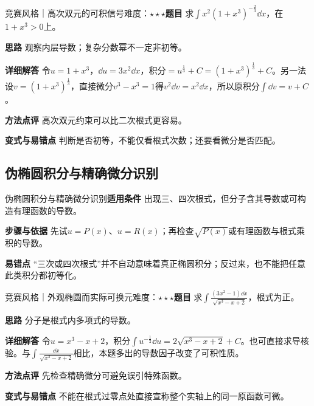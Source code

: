 \begin{example}{竞赛风格｜高次双元的可积信号}{难度：$\star\star\star$}\label{deep:ex:integral_source_deep:binomial}\textbf{题目} 求$\int x^2(1+x^3)^{-\frac{2}{3}}\dd x$，在$1+x^3>0$上。\par\textbf{思路} 观察内层导数；复杂分数幂不一定非初等。\par\textbf{详细解答} 令$u=1+x^3$，$\dd u=3x^2\dd x$，积分$=u^{\frac{1}{3}}+C=(1+x^3)^{\frac{1}{3}}+C$。另一法设$v=(1+x^3)^{\frac{1}{3}}$，直接微分$v^3-x^3=1$得$v^2\dd v=x^2\dd x$，所以原积分$\int\dd v=v+C$。\par\textbf{方法点评} 高次双元约束可以比二次根式更容易。\par\textbf{变式与易错点} 判断是否初等，不能仅看根式次数；还要看微分是否匹配。\end{example}

\subsection{伪椭圆积分与精确微分识别}\label{deep:integral_source_deep:pseudo}

\begin{method}{伪椭圆积分与精确微分识别}\textbf{适用条件} 出现三、四次根式，但分子含其导数或可构造有理函数的导数。\par\textbf{步骤与依据} 先试$u=P(x)$、$u=R(x)$；再检查$\sqrt{P(x)}$或有理函数与根式乘积的导数。\par\textbf{易错点} “三次或四次根式”并不自动意味着真正椭圆积分；反过来，也不能把任意此类积分都初等化。\end{method}

\begin{example}{竞赛风格｜外观椭圆而实际可换元}{难度：$\star\star\star$}\label{deep:ex:integral_source_deep:pseudo1}\textbf{题目} 求$\int\frac{(3x^2-1)\dd x}{\sqrt{x^3-x+2}}$，根式为正。\par\textbf{思路} 分子是根式内多项式的导数。\par\textbf{详细解答} 令$u=x^3-x+2$，积分$\int u^{-\frac{1}{2}}\dd u=2\sqrt{x^3-x+2}+C$。也可直接求导核验。与$\int\frac{\dd x}{\sqrt{x^3-x+2}}$相比，本题多出的导数因子改变了可积性质。\par\textbf{方法点评} 先检查精确微分可避免误引特殊函数。\par\textbf{变式与易错点} 不能在根式过零点处直接宣称整个实轴上的同一原函数可微。\end{example}

